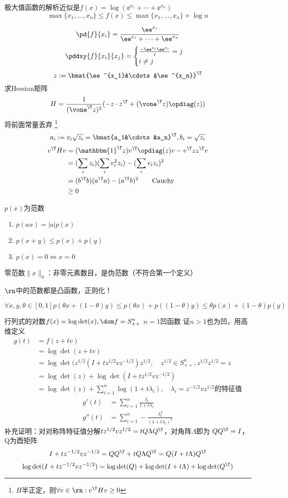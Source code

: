 极大值函数的解析近似是$f(x)=\log(\ee^{x_1}+\cdots+\ee^{x_n})$
\[\max\{x_1,\ldots,x_n\}\leq f(x)\leq\max\{x_1,\ldots,x_n\}+\log n\]
\begin{analysis}
\[\pd{f}{x_i}=\frac{\ee^{x_i}}{\ee^{x_i}+\cdots+\ee^{x_n}}\]
\[\pddxy{f}{x_i}{x_j}=\begin{cases}\frac{-\ee^{x_i}\ee^{x_i}}i=j\\i\ne j\end{cases}\]
\[z:=\bmat{\ee^{x_1}&\cdots&\ee^{x_n}}^\T\]
求Hessian矩阵
\[H=\frac{1}{(\vone^\T z)^2}(-z\cdot z^\T+(\vone^\T z)\opdiag(z))\]
将前面常量丢弃
\footnote{$H$半正定，则$\forall v\in\rn:v^\T Hv\geq 0$}
\[a_i:=v_i\sqrt{z_i}=\bmat{a_1&\cdots&a_n}^\T,b_i=\sqrt{z_i}\]
\[\begin{aligned}
v^\T Hv&=(\mathbbm{1}^\T z)v^\T \opdiag(z)v-v^\T zz^\T v\\
&=(\sum_i z_i)(\sum_i v_i^2 z_i)-(\sum_i v_i z_i)^2\\
&=(b^\T b)(a^\T a)-(a^\T b)^2\qquad\text{Cauchy}\\
&\geq 0
\end{aligned}\]
\end{analysis}

\begin{definition}[范数]
$p(x)$为范数
\begin{enumerate}
	\item $p(ax)=|a|p(x)$
	\item $p(x+y)\leq p(x)+p(y)$
	\item $p(x)=0\iff x=0$
\end{enumerate}
零范数$\|x\|_0$：非零元素数目，是伪范数（不符合第一个定义）
\end{definition}
$\rn$中的范数都是凸函数，正则化！
\begin{analysis}
\[\forall x,y,\theta\in[0,1]
p(\theta x+(1-\theta)y)\leq p(\theta x)+p((1-\theta)y)
\leq \theta p(x)+(1-\theta)p(y)\]
\end{analysis}

行列式的对数$f(x)=\log\det(x),\dom f=S_{++}^n$
$n=1$凹函数
证$n>1$也为凹，用高维定义
\[\begin{aligned}
g(t)&=f(z+tv)\\
&=\log\det(z+tv)\\
&=\log\det(z^{1/2}(I+tz^{1/2}vz^{-1/2})z^{1/2},\quad z^{1/2}\in S_{++}^n,z^{1/2}z^{1/2}=z\\
&=\log\det(z)+\log\det(I+tz^{1/2}vz^{-1/2})\\
&=\log\det(z)+\sum_{i=1}^n\log(1+t\lambda_i),\quad \lambda_i=z^{-1/2}vz^{1/2}\text{的特征值}
\end{aligned}\]
\[\begin{aligned}
g'(t)&=\sum_{i=1}^n\frac{\lambda_i}{1+t\lambda_i}\\
g''(t)&=\sum_{i=1}^n-\frac{\lambda_i^2}{(1+t\lambda_i)^2}
\end{aligned}\]
补充证明：对对称阵特征值分解$tz^{1/2}vz^{1/2}=tQ\Lambda Q^\T$，对角阵$\Lambda$即为
$QQ^\T=I$，Q为酉矩阵
\[I+tz^{-1/2}vz^{-1/2}=QQ^\T+tQ\Lambda Q^\T=Q(I+t\Lambda)Q^\T\]
\[\log\det(I+tz^{-1/2}vz^{-1/2})=\log\det(Q)+\log\det(I+t\Lambda)+\log\det(Q^\T)\]

